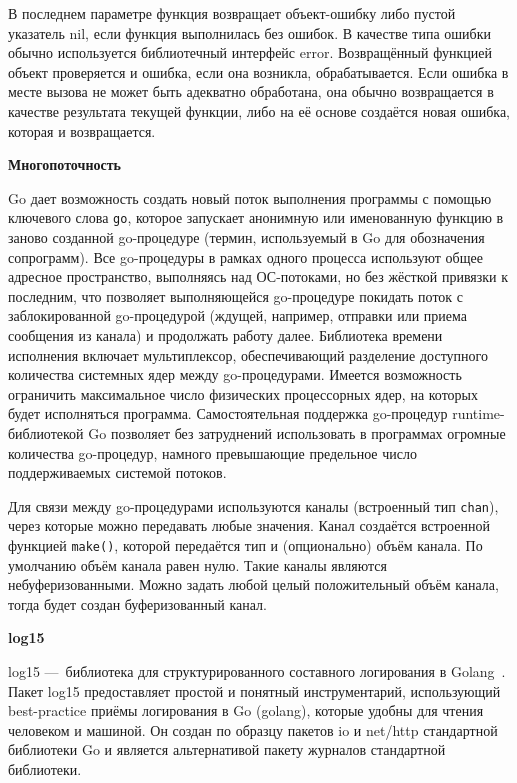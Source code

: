 В последнем параметре функция возвращает объект-ошибку либо пустой указатель nil, если функция выполнилась без ошибок. В качестве типа ошибки обычно используется библиотечный интерфейс error.
Возвращённый функцией объект проверяется и ошибка, если она возникла, обрабатывается. Если ошибка в месте вызова не может быть адекватно обработана, она обычно возвращается в качестве результата текущей функции, либо на её основе создаётся новая ошибка, которая и возвращается.

\textbf{Многопоточность}

Go дает возможность создать новый поток выполнения программы с помощью ключевого слова \lstinline{go}, которое запускает анонимную или именованную функцию в заново созданной go-процедуре (термин, используемый в Go для обозначения сопрограмм). Все go-процедуры в рамках одного процесса используют общее адресное пространство, выполняясь над ОС-потоками, но без жёсткой привязки к последним, что позволяет выполняющейся go-процедуре покидать поток с заблокированной go-процедурой (ждущей, например, отправки или приема сообщения из канала) и продолжать работу далее. Библиотека времени исполнения включает мультиплексор, обеспечивающий разделение доступного количества системных ядер между go-процедурами. Имеется возможность ограничить максимальное число физических процессорных ядер, на которых будет исполняться программа. Самостоятельная поддержка go-процедур runtime-библиотекой Go позволяет без затруднений использовать в программах огромные количества go-процедур, намного превышающие предельное число поддерживаемых системой потоков.

Для связи между go-процедурами используются каналы (встроенный тип \lstinline{chan}), через которые можно передавать любые значения. Канал создаётся встроенной функцией \lstinline{make()}, которой передаётся тип и (опционально) объём канала. По умолчанию объём канала равен нулю. Такие каналы являются небуферизованными. Можно задать любой целый положительный объём канала, тогда будет создан буферизованный канал.

\textbf{log15}

log15 — библиотека для структурированного составного логирования в Golang~\cite{log15}. Пакет log15 предоставляет простой и понятный инструментарий, использующий best-practice приёмы логирования в Go (golang), которые удобны для чтения человеком и машиной. Он создан по образцу пакетов io и net/http стандартной библиотеки Go и является альтернативой пакету журналов стандартной библиотеки.

